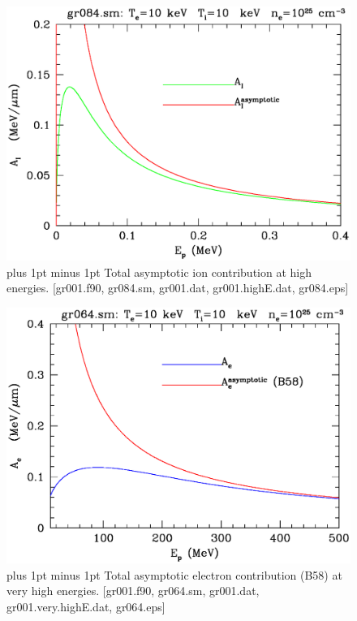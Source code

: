 \documentclass[preprint,12pt,eqsecnum,nofootinbib,amsmath,amssymb]{revtex4}
\newcommand{\footnoteskip}{\baselineskip 12pt plus 1pt minus 1pt}
\begin{document}
\vskip-2cm 
\begin{figure}[h!]
\includegraphics[scale=0.45]{gr084.eps} 
\vskip-0.8cm 
\caption{\footnoteskip  
  Total asymptotic ion contribution at high energies. [gr001.f90,
  gr084.sm, gr001.dat, gr001.highE.dat, gr084.eps] 
}
\label{fig:gr084}
\end{figure}


\vskip-2cm 
\begin{figure}[h!]
\includegraphics[scale=0.45]{gr064.eps}
\vskip-0.8cm 
\caption{\footnoteskip  
  Total asymptotic electron contribution (B58) at very high
  energies. [gr001.f90, gr064.sm, gr001.dat, gr001.very.highE.dat,
  gr064.eps] 
}
\label{fig:gr064}
\end{figure}
\end{document}
